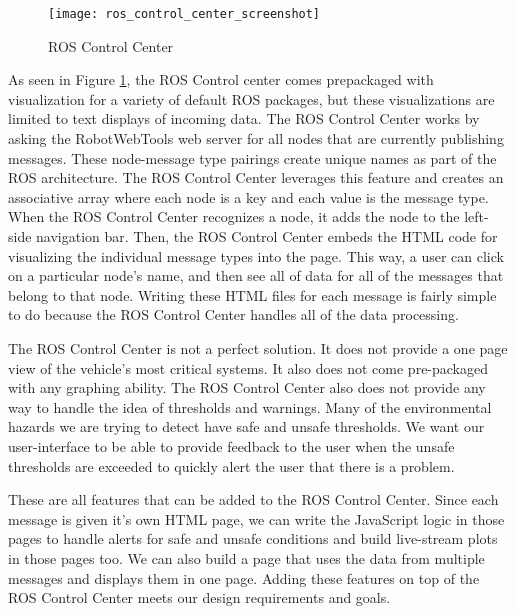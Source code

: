 \begin{figure}[H]
\centerline{\texttt{[image: ros\_control\_center\_screenshot]}}
\caption[]{ROS Control Center}
\label{fig:roscontrolcenter}
\end{figure}

As seen in Figure \ref{fig:roscontrolcenter}, the ROS Control center comes prepackaged with visualization for a variety of default ROS packages, but these visualizations are limited to text displays of incoming data.  The ROS Control Center works by asking the RobotWebTools web server for all nodes that are currently publishing messages.  These node-message type pairings create unique names as part of the ROS architecture.  The ROS Control Center leverages this feature and creates an associative array where each node is a key and each value is the message type.  When the ROS Control Center recognizes a node, it adds the node to the left-side navigation bar.  Then, the ROS Control Center embeds the HTML code for visualizing the individual message types into the page.  This way, a user can click on a particular node's name, and then see all of data for all of the messages that belong to that node.  Writing these HTML files for each message is fairly simple to do because the ROS Control Center handles all of the data processing.

The ROS Control Center is not a perfect solution.  It does not provide a one page view of the vehicle's most critical systems.  It also does not come pre-packaged with any graphing ability.  The ROS Control Center also does not provide any way to handle the idea of thresholds and warnings. Many of the environmental hazards we are trying to detect have safe and unsafe thresholds.  We want our user-interface to be able to provide feedback to the user when the unsafe thresholds are exceeded to quickly alert the user that there is a problem.

These are all features that can be added to the ROS Control Center.  Since each message is given it's own HTML page, we can write the JavaScript logic in those pages to handle alerts for safe and unsafe conditions and build live-stream plots in those pages too.  We can also build a page that uses the data from multiple messages and displays them in one page.  Adding these features on top of the ROS Control Center meets our design requirements and goals.

